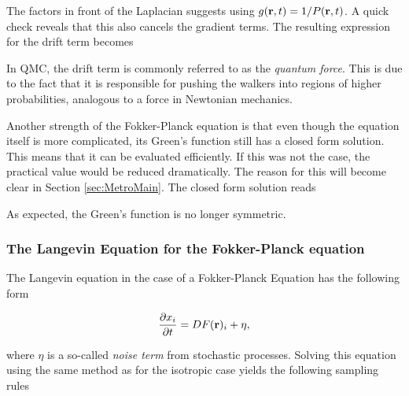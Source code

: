 The factors in front of the Laplacian suggests using $g(\mathbf{ r}, t) = 1/P(\mathbf{ r}, t)$. A quick check reveals that this also cancels the gradient terms. The resulting expression for the drift term becomes



In QMC, the drift term is commonly referred to as the \textit{quantum force}. This is due to the fact that it is responsible for pushing the walkers into regions of higher probabilities, analogous to a force in Newtonian mechanics.

Another strength of the Fokker-Planck equation is that even though the equation itself is more complicated, its Green's function still has a closed form solution. This means that it can be evaluated efficiently. If this was not the case, the practical value would be reduced dramatically. The reason for this will become clear in Section \ref{sec:MetroMain}. The closed form solution reads \cite{abInitioMC}


As expected, the Green's function is no longer symmetric.

\subsubsection{The Langevin Equation for the Fokker-Planck equation}

The Langevin equation in the case of a Fokker-Planck Equation has the following form

\begin{equation}
 \frac{\partial x_i}{\partial t} = D F(\mathbf{r})_i + \eta,
\end{equation}

where $\eta$ is a so-called \textit{noise term} from stochastic processes. Solving this equation using the same method as for the isotropic case yields the following sampling rules

